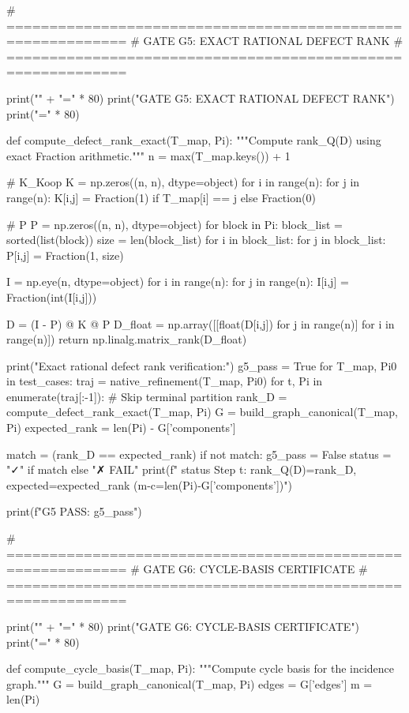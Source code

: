 # ============================================================
# GATE G5: EXACT RATIONAL DEFECT RANK
# ============================================================

print("\n" + "=" * 80)
print("GATE G5: EXACT RATIONAL DEFECT RANK")
print("=" * 80)

def compute_defect_rank_exact(T_map, Pi):
    """Compute rank_Q(D) using exact Fraction arithmetic."""
    n = max(T_map.keys()) + 1
    
    # K_Koop
    K = np.zeros((n, n), dtype=object)
    for i in range(n):
        for j in range(n):
            K[i,j] = Fraction(1) if T_map[i] == j else Fraction(0)
    
    # P
    P = np.zeros((n, n), dtype=object)
    for block in Pi:
        block_list = sorted(list(block))
        size = len(block_list)
        for i in block_list:
            for j in block_list:
                P[i,j] = Fraction(1, size)
    
    I = np.eye(n, dtype=object)
    for i in range(n):
        for j in range(n):
            I[i,j] = Fraction(int(I[i,j]))
    
    D = (I - P) @ K @ P
    D_float = np.array([[float(D[i,j]) for j in range(n)] for i in range(n)])
    return np.linalg.matrix_rank(D_float)

print("\n  Exact rational defect rank verification:")
g5_pass = True
for T_map, Pi0 in test_cases:
    traj = native_refinement(T_map, Pi0)
    for t, Pi in enumerate(traj[:-1]):  # Skip terminal partition
        rank_D = compute_defect_rank_exact(T_map, Pi)
        G = build_graph_canonical(T_map, Pi)
        expected_rank = len(Pi) - G['components']
        
        match = (rank_D == expected_rank)
        if not match:
            g5_pass = False
        status = "✓" if match else "✗ FAIL"
        print(f"    {status} Step {t}: rank_Q(D)={rank_D}, expected={expected_rank} (m-c={len(Pi)}-{G['components']})")

print(f"\n  G5 PASS: {g5_pass}")

# ============================================================
# GATE G6: CYCLE-BASIS CERTIFICATE
# ============================================================

print("\n" + "=" * 80)
print("GATE G6: CYCLE-BASIS CERTIFICATE")
print("=" * 80)

def compute_cycle_basis(T_map, Pi):
    """Compute cycle basis for the incidence graph."""
    G = build_graph_canonical(T_map, Pi)
    edges = G['edges']
    m = len(Pi)
    
